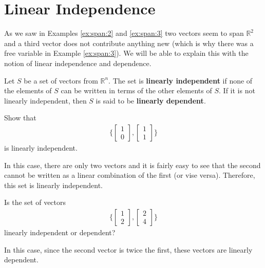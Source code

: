 \vfill \pagebreak 

\section{Linear Independence}
\label{sect:linear:ind}

As we saw in Examples \ref{ex:span:2} and \ref{ex:span:3}  two vectors seem to span $\mathbb{R}^2$ and a third vector does not contribute anything new (which is why there was a free variable in Example \ref{ex:span:3}).  We will be able to explain this with the notion of linear independence and dependence.  

\begin{definition}
Let $S$ be a set of vectors from $\mathbb{R}^n$.  The set is \textbf{linearly independent} if none of the elements of $S$ can be written in terms of the other elements of $S$.    If it is not linearly independent, then $S$ is said to be \textbf{linearly dependent}.  
\end{definition}

\begin{example}
Show that 
\begin{align*}
\{ 
\begin{bmatrix}
1 \\ 0
\end{bmatrix}, \begin{bmatrix}
1 \\ 1
\end{bmatrix} \}
\end{align*}
is linearly independent.  

\solution

In this case, there are only two vectors and it is fairly easy to see that the second cannot be written as a linear combination of the first (or vise versa).  Therefore, this set is linearly independent.  
\end{example}

\begin{example}
Is the set of vectors
\begin{align*}
\{ 
\begin{bmatrix}
1 \\ 2
\end{bmatrix}, \begin{bmatrix}
2 \\ 4
\end{bmatrix} \}
\end{align*}
linearly independent or dependent?

\solution

In this case, since the second vector is twice the first, these vectors are linearly dependent.  

\end{example}


